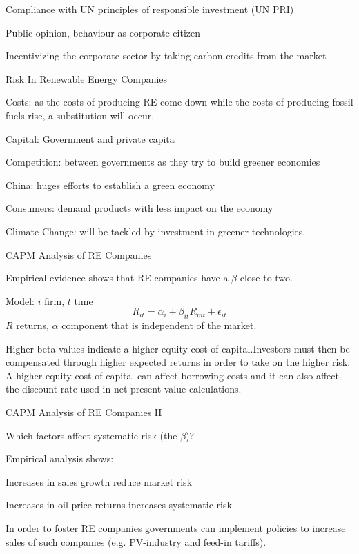 	Compliance with UN principles of responsible investment (UN PRI)

	Public opinion, behaviour as corporate citizen

	Incentivizing the corporate sector by taking carbon credits from the market



{Risk In Renewable Energy Companies}


	Costs: as the costs of producing RE come down while the costs of producing fossil fuels rise, a
substitution will occur.

	Capital: Government and private capita

	Competition: between governments as they try to build greener economies

	China: huges efforts to establish a green economy

	Consumers: demand products with less impact on the economy

	Climate Change: will be tackled by investment in greener technologies.


{CAPM Analysis of RE Companies}


	Empirical evidence shows that RE companies have a $\beta$ close to two.

	Model: $i$ firm, $t$ time
$$
R_{it}= \alpha_i + \beta_{it} R_{mt}+\epsilon_{it}
$$
$R$ returns, $\alpha$ component that is independent of the market.

	Higher beta values indicate a higher equity cost of capital.Investors must then be compensated
through higher expected returns in order to take on the higher risk. A higher equity cost of capital can affect borrowing costs and
it can also affect the discount rate used in net present value calculations.


{CAPM Analysis of RE Companies II}


	Which factors affect systematic risk (the $\beta$)?

	Empirical analysis shows:


	Increases in sales growth reduce market risk

	Increases in oil price returns increases systematic risk


	In order to foster RE companies governments can implement policies to increase sales of such companies (e.g. PV-industry and feed-in tariffs).

